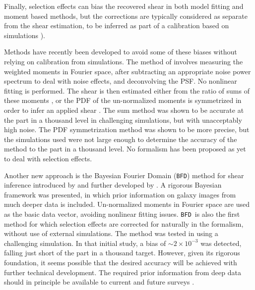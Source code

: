 \documentclass[iop]{emulateapj}
\newcommand{\bfd}{\texttt{BFD}}
\begin{document}
Finally, selection effects can bias the recovered shear in both model fitting
and moment based methods, but the corrections are typically considered as
separate from the shear estimation, to be inferred as part of a calibration
based on simulations \citep{Jarvis2016,KidsShear2017}).

Methods have recently been developed to avoid some of these biases without
relying on calibration from simulations.  The method of \cite{Zhang2017}
involves measuring the weighted moments in Fourier space, after subtracting an
appropriate noise power spectrum to deal with noise effects, and deconvolving
the PSF.  No nonlinear fitting is performed.  The shear is then estimated
either from the ratio of sums of these moments \citep{Zhang2015}, or the PDF of
the un-normalized moments is symmetrized in order to infer an applied shear
\citep{Zhang2017}.  The sum method was shown to be accurate at the part in a
thousand level in challenging simulations, but with unacceptably high noise.
The PDF symmetrization method was shown to be more precise, but the simulations
used were not large enough to determine the accuracy of the method to the part
in a thousand level.  No formalism has been proposed as yet to deal with
selection effects. 

Another new approach is the Bayesian Fourier Domain (\bfd) method for shear
inference introduced by \cite{ba14} and further developed by \cite{bfd2016}.  A
rigorous Bayesian framework was presented, in which prior information on galaxy
images from much deeper data is included.  Un-normalized moments in
Fourier space are used as the basic data vector, avoiding nonlinear fitting
issues.  \bfd\ is also the first method for which selection effects are
corrected for naturally in the formalism, without use of external
simulations.  The method was tested in \cite{bfd2016} using a challenging
simulation.  In that initial study, a bias of $\sim 2 \times 10^{-3}$ was
detected, falling just short of the part in a thousand target.  However, given
its rigorous foundation, it seems possible that the desired accuracy will be
achieved with further technical development.  The required prior information
from deep data should in principle be available to current and future surveys
\citep{DESWhitePaper,TakadaHSC2010,IvezicLSST08,Euclid2011,SpergelWFIRST2015}.


\end{document}
